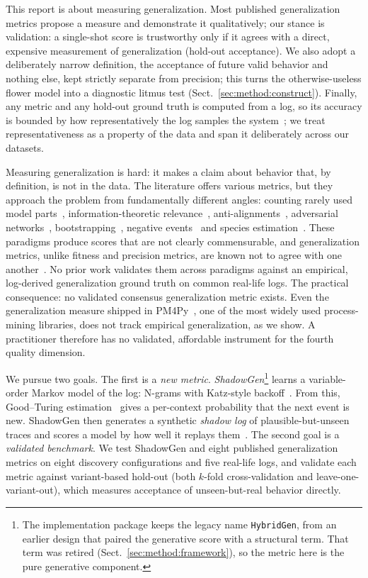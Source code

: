 \documentclass[runningheads]{llncs}
\begin{document}
This report is about measuring generalization. Most published generalization metrics propose a measure and demonstrate it qualitatively; our stance is validation: a single-shot score is trustworthy only if it agrees with a direct, expensive measurement of generalization (hold-out acceptance). We also adopt a deliberately narrow definition, the acceptance of future valid behavior and nothing else, kept strictly separate from precision; this turns the otherwise-useless flower model into a diagnostic litmus test (Sect.~\ref{sec:method:construct}). Finally, any metric and any hold-out ground truth is computed from a log, so its accuracy is bounded by how representatively the log samples the system~\cite{karunaratne2024representativeness}; we treat representativeness as a property of the data and span it deliberately across our datasets.

Measuring generalization is hard: it makes a claim about behavior that, by definition, is not in the data. The literature offers various metrics, but they approach the problem from fundamentally different angles: counting rarely used model parts~\cite{buijs2014quality}, information-theoretic relevance~\cite{alkhammash2022entropic}, anti-alignments~\cite{vandongen2016anti}, adversarial networks~\cite{theis2020avatar}, bootstrapping~\cite{polyvyanyy2022bootstrap}, negative events~\cite{vandenbroucke2014negative} and species estimation~\cite{kabierski2023species}. These paradigms produce scores that are not clearly commensurable, and generalization metrics, unlike fitness and precision metrics, are known not to agree with one another~\cite{janssenswillen2017comparative}. No prior work validates them across paradigms against an empirical, log-derived generalization ground truth on common real-life logs. The practical consequence: no validated consensus generalization metric exists. Even the generalization measure shipped in PM4Py~\cite{berti2019pm4py}, one of the most widely used process-mining libraries, does not track empirical generalization, as we show. A practitioner therefore has no validated, affordable instrument for the fourth quality dimension.

We pursue two goals. The first is a \emph{new metric}. \emph{ShadowGen}\footnote{The implementation package keeps the legacy name \texttt{HybridGen}, from an earlier design that paired the generative score with a structural term. That term was retired (Sect.~\ref{sec:method:framework}), so the metric here is the pure generative component.} learns a variable-order Markov model of the log: N-grams with Katz-style backoff~\cite{katz1987}. From this, Good--Turing estimation~\cite{gale1995gt} gives a per-context probability that the next event is new. ShadowGen then generates a synthetic \emph{shadow log} of plausible-but-unseen traces and scores a model by how well it replays them~\cite{rozinat2008conformance}. The second goal is a \emph{validated benchmark}. We test ShadowGen and eight published generalization metrics on eight discovery configurations and five real-life logs, and validate each metric against variant-based hold-out (both $k$-fold cross-validation and leave-one-variant-out), which measures acceptance of unseen-but-real behavior directly.
\end{document}
